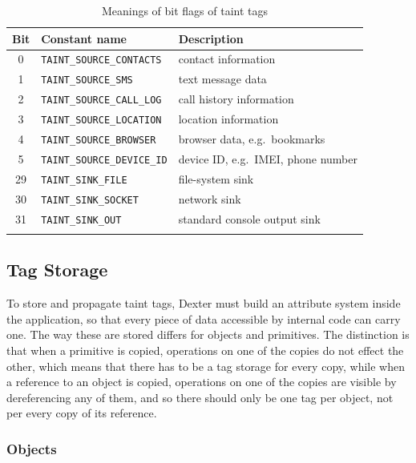 \documentclass[12pt,twoside,notitlepage]{report}
\begin{document}
\begin{table}
	\begin{center}
	\begin{tabular}{|c|l|l|}
		\firsthline
		\textbf{Bit} & \textbf{Constant name}        & \textbf{Description} \\
		\hline
		0            & \verb$TAINT_SOURCE_CONTACTS$  & contact information \\
		1            & \verb$TAINT_SOURCE_SMS$       & text message data \\
		2            & \verb$TAINT_SOURCE_CALL_LOG$  & call history information \\
		3            & \verb$TAINT_SOURCE_LOCATION$  & location information \\
		4            & \verb$TAINT_SOURCE_BROWSER$   & browser data, e.g.\ bookmarks \\
		5            & \verb$TAINT_SOURCE_DEVICE_ID$ & device ID, e.g.\ IMEI, phone number \\
		\hline
		29           & \verb$TAINT_SINK_FILE$        & file-system sink \\
		30           & \verb$TAINT_SINK_SOCKET$      & network sink \\
		31           & \verb$TAINT_SINK_OUT$         & standard console output sink \\
		\lasthline
	\end{tabular}
	\end{center}
	\caption{Meanings of bit flags of taint tags}
	\label{table:TaintTagStorage_BitMeaning}
\end{table}

\subsection{Tag Storage}

To store and propagate taint tags, Dexter must build an attribute system inside the application, so that every piece of data accessible by internal code can carry one. The way these are stored differs for objects and primitives. The distinction is that when a primitive is copied, operations on one of the copies do not effect the other, which means that there has to be a tag storage for every copy, while when a reference to an object is copied, operations on one of the copies are visible by dereferencing any of them, and so there should only be one tag per object, not per every copy of its reference. 

\subsubsection{Objects}
\label{section:TaintTagStorage_Objects}
\end{document}
